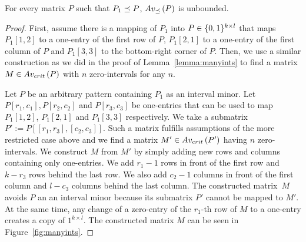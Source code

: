 \begin{thm}
For every matrix $P$ such that $P_1\preceq P$, $Av_{\preceq}\left(P\right)$ is unbounded.
\end{thm}
\begin{proof}
First, assume there is a mapping of $P_1$ into $P\in\{0,1\}^{k\times l}$ that maps $P_1[1,2]$ to a one-entry of the first row of $P$, $P_1[2,1]$ to a one-entry of the first column of $P$ and $P_1[3,3]$ to the bottom-right corner of $P$. Then, we use a similar construction as we did in the proof of Lemma~\ref{lemma:manyints} to find a matrix $M\in Av_{crit}\left(P\right)$ with $n$ zero-intervals for any $n$.

Let $P$ be an arbitrary pattern containing $P_1$ as an interval minor. Let $P[r_1,c_1],P[r_2,c_2]$ and $P[r_3,c_3]$ be one-entries that can be used to map $P_1[1,2]$, $P_1[2,1]$ and $P_1[3,3]$ respectively. We take a submatrix~$P':=P[[r_1,r_3],[c_2,c_3]]$. Such a matrix fulfills assumptions of the more restricted case above and we find a matrix $M'\in Av_{crit}\left(P'\right)$ having $n$ zero-intervals. We construct $M$ from $M'$ by simply adding new rows and columns containing only one-entries. We add $r_1-1$ rows in front of the first row and $k-r_3$ rows behind the last row. We also add $c_2-1$ columns in front of the first column and $l-c_3$ columns behind the last column. The constructed matrix~$M$ avoids $P$ an an interval minor because its submatrix $P'$ cannot be mapped to $M'$. At the same time, any change of a zero-entry of the $r_1$-th row of $M$ to a one-entry creates a copy of ${1}^{k\times l}$. The constructed matrix $M$ can be seen in Figure~\ref{fig:manyints}.
\end{proof}


